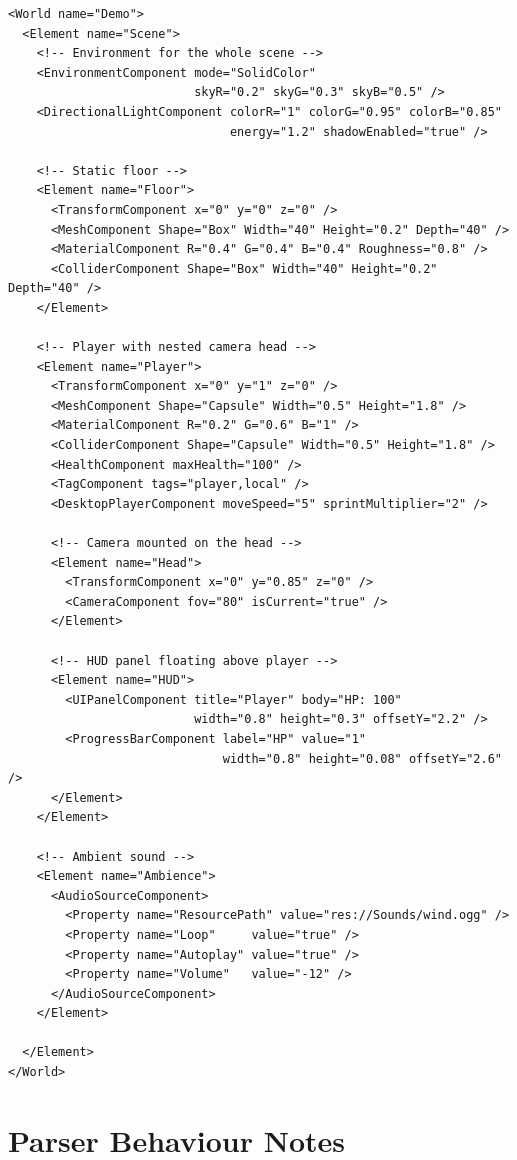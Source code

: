 \documentclass[11pt,a4paper]{article}
\begin{document}
\begin{lstlisting}
<World name="Demo">
  <Element name="Scene">
    <!-- Environment for the whole scene -->
    <EnvironmentComponent mode="SolidColor"
                          skyR="0.2" skyG="0.3" skyB="0.5" />
    <DirectionalLightComponent colorR="1" colorG="0.95" colorB="0.85"
                               energy="1.2" shadowEnabled="true" />

    <!-- Static floor -->
    <Element name="Floor">
      <TransformComponent x="0" y="0" z="0" />
      <MeshComponent Shape="Box" Width="40" Height="0.2" Depth="40" />
      <MaterialComponent R="0.4" G="0.4" B="0.4" Roughness="0.8" />
      <ColliderComponent Shape="Box" Width="40" Height="0.2" Depth="40" />
    </Element>

    <!-- Player with nested camera head -->
    <Element name="Player">
      <TransformComponent x="0" y="1" z="0" />
      <MeshComponent Shape="Capsule" Width="0.5" Height="1.8" />
      <MaterialComponent R="0.2" G="0.6" B="1" />
      <ColliderComponent Shape="Capsule" Width="0.5" Height="1.8" />
      <HealthComponent maxHealth="100" />
      <TagComponent tags="player,local" />
      <DesktopPlayerComponent moveSpeed="5" sprintMultiplier="2" />

      <!-- Camera mounted on the head -->
      <Element name="Head">
        <TransformComponent x="0" y="0.85" z="0" />
        <CameraComponent fov="80" isCurrent="true" />
      </Element>

      <!-- HUD panel floating above player -->
      <Element name="HUD">
        <UIPanelComponent title="Player" body="HP: 100"
                          width="0.8" height="0.3" offsetY="2.2" />
        <ProgressBarComponent label="HP" value="1"
                              width="0.8" height="0.08" offsetY="2.6" />
      </Element>
    </Element>

    <!-- Ambient sound -->
    <Element name="Ambience">
      <AudioSourceComponent>
        <Property name="ResourcePath" value="res://Sounds/wind.ogg" />
        <Property name="Loop"     value="true" />
        <Property name="Autoplay" value="true" />
        <Property name="Volume"   value="-12" />
      </AudioSourceComponent>
    </Element>

  </Element>
</World>
\end{lstlisting}

\section{Parser Behaviour Notes}
\end{document}
